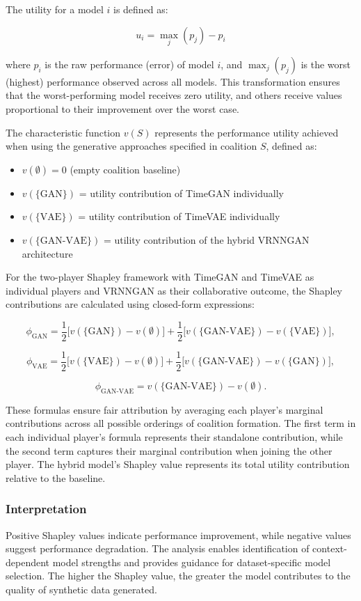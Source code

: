 \documentclass{article}
\begin{document}
The utility for a model \( i \) is defined as:

\[
u_i = \max_j(p_j) - p_i
\]

where \( p_i \) is the raw performance (error) of model \( i \), and \( \max_j(p_j) \) is the worst (highest) performance observed across all models. This transformation ensures that the worst-performing model receives zero utility, and others receive values proportional to their improvement over the worst case.

The characteristic function $v(S)$ represents the performance utility achieved when using the generative approaches specified in coalition $S$, defined as:
\begin{itemize}
    \item \( v(\emptyset) = 0 \) (empty coalition baseline)
    \item \( v(\{\text{GAN}\}) \) = utility contribution of TimeGAN individually
    \item \( v(\{\text{VAE}\}) \) = utility contribution of TimeVAE individually  
    \item \( v(\{\text{GAN-VAE}\}) \) = utility contribution of the hybrid VRNNGAN architecture
\end{itemize}

For the two-player Shapley framework with TimeGAN and TimeVAE as individual players and VRNNGAN as their collaborative outcome, the Shapley contributions are calculated using closed-form expressions:

\[
\phi_{\text{GAN}} = \frac{1}{2} \big[v(\{\text{GAN}\}) - v(\emptyset)\big] + \frac{1}{2} \big[v(\{\text{GAN-VAE}\}) - v(\{\text{VAE}\})\big],
\]

\[
\phi_{\text{VAE}} = \frac{1}{2} \big[v(\{\text{VAE}\}) - v(\emptyset)\big] + \frac{1}{2} \big[v(\{\text{GAN-VAE}\}) - v(\{\text{GAN}\})\big],
\]

\[
\phi_{\text{GAN-VAE}} = v(\{\text{GAN-VAE}\}) - v(\emptyset).
\]

These formulas ensure fair attribution by averaging each player's marginal contributions across all possible orderings of coalition formation. The first term in each individual player's formula represents their standalone contribution, while the second term captures their marginal contribution when joining the other player. The hybrid model's Shapley value represents its total utility contribution relative to the baseline.

\subsubsection{Interpretation}
Positive Shapley values indicate performance improvement, while negative values suggest performance degradation. The analysis enables identification of context-dependent model strengths and provides guidance for dataset-specific model selection. The higher the Shapley value, the greater the model contributes to the quality of synthetic data generated.
\end{document}
